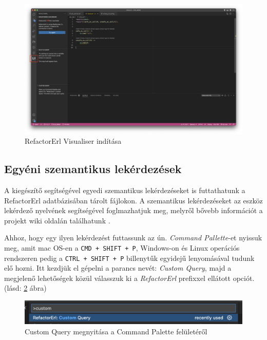 \begin{figure}[H]
  \centering
  \includegraphics[width=\linewidth, clip=true, trim = 0mm 0mm 150mm 0mm]{images/start_visualiser.png}
  \caption{RefactorErl Visualiser indítása}
  \label{fig:start_visualiser}
\end{figure}


\subsection{Egyéni szemantikus lekérdezések}
A kiegészítő segítségével egyedi szemantikus lekérdezéseket is futtathatunk a RefactorErl adatbázisában tárolt fájlokon. A szemantikus lekérdezéseket az eszköz lekérdező nyelvének segítségével foglmazhatjuk meg, melyről bővebb információt a projekt wiki oldalán találhatunk \cite{referlWikiSemanticQuery}. \cite{actaelect11}

Ahhoz, hogy egy ilyen lekérdezést futtassunk az ún. \textit{Command Pallette}-et nyissuk meg, amit mac OS-en a \lstinline{CMD + SHIFT + P}, Windows-on és Linux operációs rendszeren pedig a \lstinline{CTRL + SHIFT + P} billenytűk egyidejű lenyomásával tudunk elő hozni. Itt kezdjük el gépelni a parancs nevét: \textit{Custom Query}, majd a megjelenő lehetőségek közül válasszuk ki a \textit{RefactorErl} prefixxel ellátott opciót. (lásd: \ref{fig:custom_query_palette} ábra)
\begin{figure}[H]
  \centering
  \includegraphics[width=\linewidth]{images/custom_query_palette.png}
  \caption{Custom Query megnyitása a Command Palette felületéről}
  \label{fig:custom_query_palette}
\end{figure}

